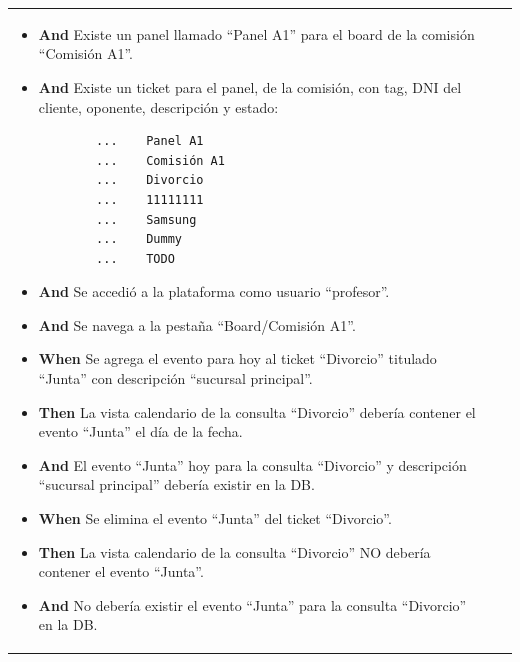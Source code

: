 \begin{longtable}{|p{1cm}|p{2.5cm}|p{12cm}|}
\begin{itemize}
        \item \textbf{And} Existe un panel llamado ``Panel A1'' para el board de la comisión ``Comisión A1''.
        \item \textbf{And} Existe un ticket para el panel, de la comisión, con tag, DNI del cliente, oponente, descripción y estado:
        \begin{verbatim}
        ...    Panel A1
        ...    Comisión A1
        ...    Divorcio
        ...    11111111
        ...    Samsung
        ...    Dummy
        ...    TODO
        \end{verbatim}
        \item \textbf{And} Se accedió a la plataforma como usuario ``profesor''.
        \item \textbf{And} Se navega a la pestaña ``Board/Comisión A1''.
        \newline
    
        \item \textbf{When} Se agrega el evento para hoy al ticket ``Divorcio'' titulado ``Junta'' con descripción ``sucursal principal''.
        \newline
    
        \item \textbf{Then} La vista calendario de la consulta ``Divorcio'' debería contener el evento ``Junta'' el día de la fecha.
        \item \textbf{And} El evento ``Junta'' hoy para la consulta ``Divorcio'' y descripción ``sucursal principal'' debería existir en la DB.
        \newline

        \item \textbf{When} Se elimina el evento ``Junta'' del ticket ``Divorcio''.
        \newline
        
        \item \textbf{Then} La vista calendario de la consulta ``Divorcio'' NO debería contener el evento ``Junta''.
        \item \textbf{And} No debería existir el evento ``Junta'' para la consulta ``Divorcio'' en la DB.


\end{itemize}
\end{longtable}
